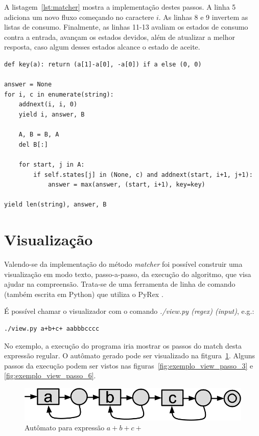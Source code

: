 \documentclass[a4paper,12pt,oneside,onecolumn]{uerj}
\begin{document}
A listagem~\ref{lst:matcher} mostra a implementação destes passos. A linha 5 adiciona um novo fluxo começando no caractere $i$. As linhas 8 e 9 invertem as listas de consumo. Finalmente, as linhas 11-13 avaliam os estados de consumo contra a entrada, avançam os estados devidos, além de atualizar a melhor resposta, caso algum desses estados alcance o estado de aceite.

\vspace{0.5cm}
\begin{lstlisting}[caption={Implementação do método \emph{matcher}},label=lst:matcher]
def key(a): return (a[1]-a[0], -a[0]) if a else (0, 0)

answer = None
for i, c in enumerate(string):
    addnext(i, i, 0)
    yield i, answer, B
    
    A, B = B, A
    del B[:]

    for start, j in A:
        if self.states[j] in (None, c) and addnext(start, i+1, j+1):
            answer = max(answer, (start, i+1), key=key)
    
yield len(string), answer, B
\end{lstlisting}

\section{Visualização}

Valendo-se da implementação do método \emph{matcher} foi possível construir uma visualização em modo texto, passo-a-passo, da execução do algoritmo, que visa ajudar na compreensão. Trata-se de uma ferramenta de linha de comando (também escrita em Python) que utiliza o PyRex .

É possível chamar o visualizador com o comando \emph{./view.py (regex) (input)}, e.g.:

\begin{verbatim}
./view.py a+b+c+ aabbbcccc
\end{verbatim}

No exemplo, a execução do programa iria mostrar os passos do match desta expressão regular. O autômato gerado pode ser visualizado na fitgura~\ref{fig:view_automaton}. Alguns passos da execução podem ser vistos nas figuras~\ref{fig:exemplo_view_passo_3} e \ref{fig:exemplo_view_passo_6}.

\begin{figure}[ht]
  \centering
  \includegraphics[scale=0.35]{figures/view_automaton.png}
  \caption{Autômato para expressão $a+b+c+$}
  \label{fig:view_automaton}
\end{figure}
\end{document}
